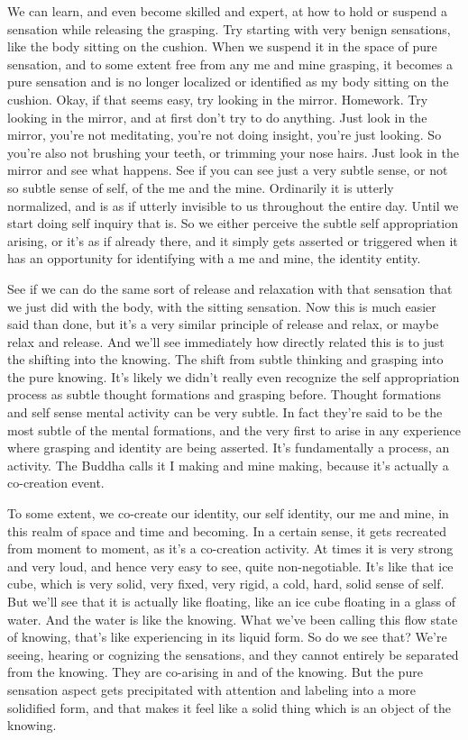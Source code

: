 \documentclass[12pt,openany]{book}
\begin{document}
We can learn, and even become skilled and expert, at how to hold or suspend a sensation while releasing the grasping. Try starting with very benign sensations, like the body sitting on the cushion. When we suspend it in the space of pure sensation, and to some extent free from any me and mine grasping, it becomes a pure sensation and is no longer localized or identified as my body sitting on the cushion. Okay, if that seems easy, try looking in the mirror. Homework. Try looking in the mirror, and at first don't try to do anything. Just look in the mirror, you're not meditating, you're not doing insight, you're just looking. So you're also not brushing your teeth, or trimming your nose hairs. Just look in the mirror and see what happens. See if you can see just a very subtle sense, or not so subtle sense of self, of the me and the mine. Ordinarily it is utterly normalized, and is as if utterly invisible to us throughout the entire day. Until we start doing self inquiry that is. So we either perceive the subtle self appropriation arising, or it's as if already there, and it simply gets asserted or triggered when it has an opportunity for identifying with a me and mine, the identity entity. 

See if we can do the same sort of release and relaxation with that sensation that we just did with the body, with the sitting sensation. Now this is much easier said than done, but it's a very similar principle of release and relax, or maybe relax and release. And we'll see immediately how directly related this is to just the shifting into the knowing. The shift from subtle thinking and grasping into the pure knowing. It's likely we didn't really even recognize the self appropriation process as subtle thought formations and grasping before. \linebreak Thought formations and self sense mental activity can be very subtle. In fact they're said to be the most subtle of the mental formations, and the very first to arise in any experience where grasping and identity are being asserted. It’s fundamentally a process, an activity. The Buddha calls it I making and mine making, because it's actually a co-creation event.

To some extent, we co-create our identity, our self identity, our me and mine, in this realm of space and time and becoming. In a certain sense, it gets recreated from moment to moment, as it's a co-creation activity. At times it is very strong and very loud, and hence very easy to see, quite non-negotiable. It's like that ice cube, which is very solid, very fixed, very rigid, a cold, hard, solid sense of self. But we'll see that it is actually like floating, like an ice cube floating in a glass of water. And the water is like the knowing. What we’ve been calling this flow state of knowing, that's like experiencing in its liquid form. So do we see that? We're seeing, hearing or cognizing the sensations, and they cannot entirely be separated from the knowing. They are co-arising in and of the knowing. But the pure sensation aspect gets precipitated with attention and labeling into a more solidified form, and that makes it feel like a solid thing which is an object of the knowing. 
\end{document}
